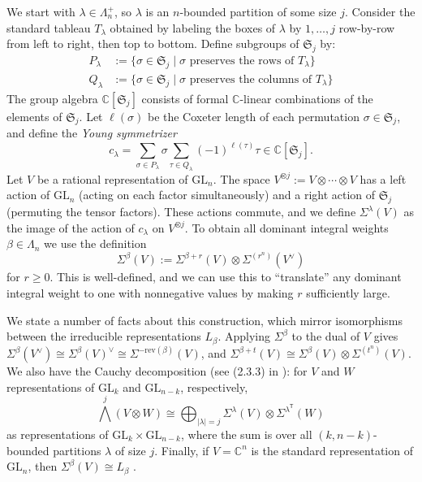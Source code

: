 \documentclass{amsart}
\newcommand\T{\mathsf{T}}
\newcommand\GL{\mathrm{GL}}
\theoremstyle{plain}
\theoremstyle{definition}
\numberwithin{equation}{section}
\begin{document}
We start with $\lambda\in\Lambda_n^+$, so $\lambda$ is an $n$-bounded partition of some size $j$. Consider the standard tableau $T_\lambda$ obtained by labeling the boxes of $\lambda$ by $1,\dots,j$ row-by-row from left to right, then top to bottom. Define subgroups of $\mathfrak{S}_j$ by:
\begin{align*}
P_\lambda&:=\{\sigma\in\mathfrak{S}_j\mid \text{$\sigma$ preserves the rows of $T_\lambda$}\} \\
Q_\lambda&:=\{\sigma\in\mathfrak{S}_j\mid \text{$\sigma$ preserves the columns of $T_\lambda$}\}
\end{align*}
The group algebra $\mathbb{C}[\mathfrak{S}_j]$ consists of formal $\mathbb{C}$-linear combinations of the elements of $\mathfrak{S}_j$. Let $\ell(\sigma)$ be the Coxeter length of each permutation $\sigma\in\mathfrak{S}_j$, and define the \emph{Young symmetrizer}
\[c_\lambda=\sum_{\sigma\in P_\lambda}\sigma\sum_{\tau\in Q_\lambda}(-1)^{\ell(\tau)}\tau\in\mathbb{C}[\mathfrak{S}_j].\]
Let $V$ be a rational representation of $\GL_n$. The space $V^{\otimes j}:=V\otimes\cdots\otimes V$ has a left action of $\GL_n$ (acting on each factor simultaneously) and a right action of $\mathfrak{S}_j$ (permuting the tensor factors). These actions commute, and we define $\Sigma^\lambda(V)$ as the image of the action of $c_\lambda$ on $V^{\otimes j}$. To obtain all dominant integral weights $\beta\in\Lambda_n$ we use the definition
\[\Sigma^\beta(V):=\Sigma^{\beta+r}(V)\otimes \Sigma^{(r^n)}(V^\vee)\]
for $r\geq 0$. This is well-defined, and we can use this to ``translate'' any dominant integral weight to one with nonnegative values by making $r$ sufficiently large.

We state a number of facts about this construction, which mirror isomorphisms between the irreducible representations $L_\beta$. Applying $\Sigma^\beta$ to the dual of $V$ gives $\Sigma^\beta(V^\vee)\cong\Sigma^\beta(V)^\vee\cong\Sigma^{-\mathrm{rev}(\beta)}(V)$, and $\Sigma^{\beta+t}(V)\cong\Sigma^\beta(V)\otimes\Sigma^{(t^n)}(V)$. We also have the Cauchy decomposition (see (2.3.3) in \cite{Wey03}): for $V$ and $W$ representations of $\GL_k$ and $\GL_{n-k}$, respectively,
\begin{equation}\label{eq:schur cauchy decomposition}
{\bigwedge}^j\left(V\otimes W\right)\cong \bigoplus_{|\lambda|=j} \Sigma^\lambda(V)\otimes \Sigma^{\lambda^\T}(W)
\end{equation}
as representations of $\GL_k\times \GL_{n-k}$, where the sum is over all $(k,n-k)$-bounded partitions $\lambda$ of size $j$. Finally, if $V=\mathbb{C}^n$ is the standard representation of $\GL_n$, then $\Sigma^\beta(V)\cong L_\beta$ \cite{Kop84}.
\end{document}
